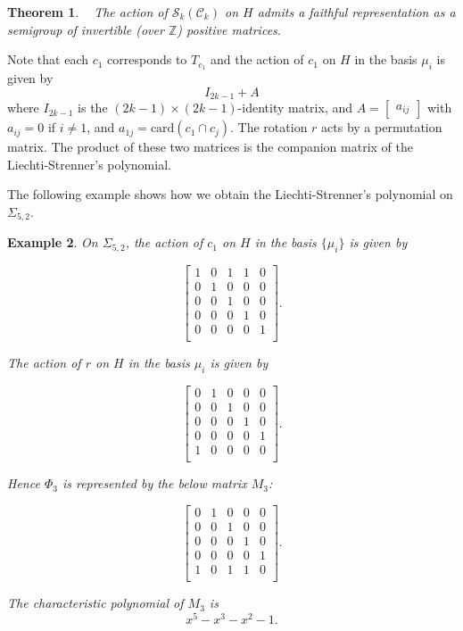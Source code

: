 \documentclass{amsart}
\newtheorem{thm}{Theorem}[section]
\newtheorem{ex}[thm]{Example}
\theoremstyle{definition}
\theoremstyle{remark}
\newcommand{\Z}{\mathbb{Z}}
\begin{document}
\vspace{2ex}

\begin{thm}~\cite[Theorem 3.4]{Penner88}
The action of $\mathcal{S}_k (\mathcal{C}_k)$ on $H$ admits a faithful representation as a semigroup of invertible (over $\Z$) positive matrices.
\end{thm}

Note that each $c_1$ corresponds to $T_{c_1}$ and the action of $c_1$ on $H$ in the basis $\mu_i$ is given by
$$I_{2k-1}+A$$
where $I_{2k-1}$ is the $(2k-1) \times (2k-1)$-identity matrix, and $A=\begin{bmatrix} a_{ij} \end{bmatrix}$ with $a_{ij}=0$ if $i \neq 1$, and $a_{1j}=\text{card}(c_1 \cap c_j)$.
The rotation $r$ acts by a permutation matrix.
The product of these two matrices is the companion matrix of the Liechti-Strenner's polynomial.

The following example shows how we obtain the Liechti-Strenner's polynomial on $\Sigma_{5,2}$.

\begin{ex}
On $\Sigma_{5,2}$, the action of $c_1$ on $H$ in the basis $\{\mu_i\}$ is given by

$$\begin{bmatrix}
1 & 0 & 1 & 1 & 0  \\
0 & 1 & 0 & 0 & 0  \\
0 & 0 & 1 & 0 & 0  \\
0 & 0 & 0 & 1 & 0  \\
0 & 0 & 0 & 0 & 1  \\

\end{bmatrix}.$$

The action of $r$ on $H$ in the basis $\mu_i$ is given by

$$\begin{bmatrix}
0 & 1 & 0 & 0 & 0 \\
0 & 0 & 1 & 0 & 0  \\
0 & 0 & 0 & 1 & 0 \\
0 & 0 & 0 & 0 & 1 \\
1 & 0 & 0 & 0 & 0  \\
\end{bmatrix}.$$

Hence $\Phi_3$ is represented by the below matrix $M_3$:

$$\begin{bmatrix}
0 & 1 & 0 & 0 & 0  \\
0 & 0 & 1 & 0 & 0  \\
0 & 0 & 0 & 1 & 0  \\
0 & 0 & 0 & 0 & 1  \\
1 & 0 & 1 & 1 & 0  \\
\end{bmatrix}.$$

The characteristic polynomial of $M_3$ is 
$$x^5-x^3-x^2-1.$$
\end{ex}
\end{document}
